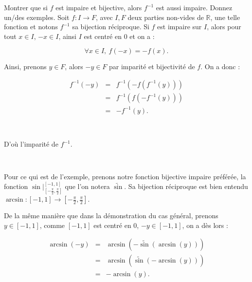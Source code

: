 \documentclass{article}
\renewenvironment{question_kholle}[2][ ]
{
	\subsection{\texorpdfstring{#2}{}}
	\notblank{#1}
	{
		\noindent #1
		\bigbreak
	}
	{}
	\begin{proof}
}
{
	\end{proof}
}
\begin{document}
\begin{question_kholle}{Montrer que si $f$ est impaire et bijective, alors $f^{-1}$ est aussi impaire. Donnez un/des exemples.} 
	Soit $f: I \to F$, avec $I,F$ deux parties non-vides de $\mathbb{R}$, une telle fonction et notons $f^{-1}$ sa bijection réciproque. Si $f$ est impaire sur $I$, alors pour tout $x\in I$, $-x\in I$, ainsi $I$ est centré en $0$ et on a : 
	
	\begin{equation*}
	    \forall x \in I, \ f(-x) = -f(x).
	\end{equation*}
	
	Ainsi, prenons $y\in F$, alors $-y \in F$ par imparité et bijectivité de $f$. On a donc : 
	
	\begin{eqnarray*}
		f^{-1}(-y) & = & f^{-1}(-f(f^{-1}(y))) \\
			& = & f^{-1}(f(-f^{-1}(y))) \\
		    & = & -f^{-1}(y).
	\end{eqnarray*}
	
	\
	
	D'où l'imparité de $f^{-1}$.
	
	\
	
	Pour ce qui est de l'exemple, prenons notre fonction bijective impaire préférée, la fonction $\textstyle \sin |_{\left[ -\frac{\pi}{2}, \frac{\pi}{2}\right] }^{[-1,1]}$ que l'on notera $\widetilde{\sin}$. Sa bijection réciproque est bien entendu $\textstyle \arcsin : [-1,1] \to \left[ -\frac{\pi}{2}, \frac{\pi}{2}\right]$.
	
	De la même manière que dans la démonstration du cas général, prenons $y\in [-1, 1]$, comme $[-1,1]$ est centré en $0$, $-y\in [-1,1]$, on a dès lors : 
	
	\begin{eqnarray*}
		\arcsin(-y) & = & \arcsin(-\widetilde{\sin}(\arcsin(y))) \\
			& = & \arcsin(\widetilde{\sin}(-\arcsin(y))) \\
		    & = & -\arcsin(y).
	\end{eqnarray*}
\end{question_kholle}
\end{document}
